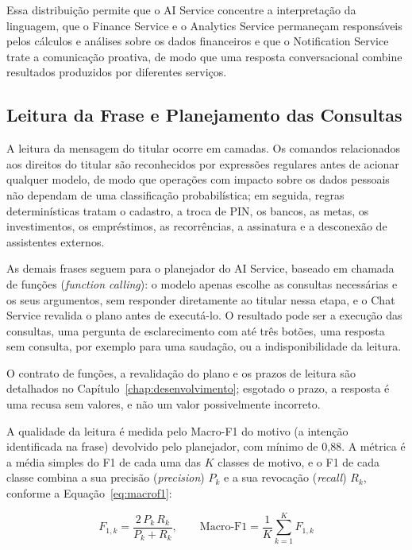 Essa distribuição permite que o AI Service concentre a interpretação da linguagem, que o Finance Service e o Analytics Service permaneçam responsáveis pelos cálculos e análises sobre os dados financeiros e que o Notification Service trate a comunicação proativa, de modo que uma resposta conversacional combine resultados produzidos por diferentes serviços.

\subsection{Leitura da Frase e Planejamento das Consultas}

A leitura da mensagem do titular ocorre em camadas. Os comandos relacionados aos direitos do titular são reconhecidos por expressões regulares antes de acionar qualquer modelo, de modo que operações com impacto sobre os dados pessoais não dependam de uma classificação probabilística; em seguida, regras determinísticas tratam o cadastro, a troca de PIN, os bancos, as metas, os investimentos, os empréstimos, as recorrências, a assinatura e a desconexão de assistentes externos.

As demais frases seguem para o planejador do AI Service, baseado em chamada de funções (\textit{function calling}): o modelo apenas escolhe as consultas necessárias e os seus argumentos, sem responder diretamente ao titular nessa etapa, e o Chat Service revalida o plano antes de executá-lo. O resultado pode ser a execução das consultas, uma pergunta de esclarecimento com até três botões, uma resposta sem consulta, por exemplo para uma saudação, ou a indisponibilidade da leitura.

O contrato de funções, a revalidação do plano e os prazos de leitura são detalhados no Capítulo~\ref{chap:desenvolvimento}; esgotado o prazo, a resposta é uma recusa sem valores, e não um valor possivelmente incorreto.

A qualidade da leitura é medida pelo Macro-F1 do motivo (a intenção identificada na frase) devolvido pelo planejador, com mínimo de 0,88. A métrica é a média simples do F1 de cada uma das $K$ classes de motivo, e o F1 de cada classe combina a sua precisão (\textit{precision}) $P_k$ e a sua revocação (\textit{recall}) $R_k$, conforme a Equação~\ref{eq:macrof1}:

\begin{equation}
F_{1,k} = \frac{2\, P_k\, R_k}{P_k + R_k},
\qquad
\text{Macro-F1} = \frac{1}{K} \sum_{k=1}^{K} F_{1,k}
\label{eq:macrof1}
\end{equation}

